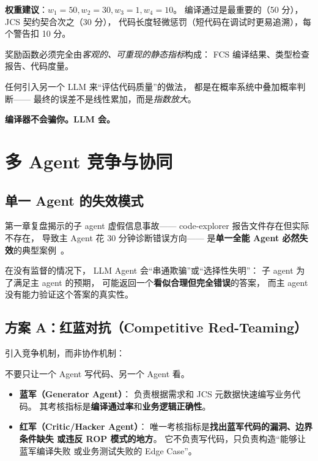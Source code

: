\documentclass[10pt, openany]{book}
\begin{document}
\textbf{权重建议}：\(w_1 = 50, w_2 = 30, w_3 = 1, w_4 = 10\)。
编译通过是最重要的（50 分），JCS 契约契合次之（30 分），
代码长度轻微惩罚（短代码在调试时更易追溯），每个警告扣 10 分。

\begin{principle}
    奖励函数必须完全由\emph{客观的、可重现的静态指标}构成：
    FCS 编译结果、类型检查报告、代码度量。
    
    任何引入另一个 LLM 来``评估代码质量''的做法，
    都是在概率系统中叠加概率判断——
    最终的误差不是线性累加，而是\emph{指数放大}。
    
    \textbf{编译器不会骗你。LLM 会。}
\end{principle}

\section{多 Agent 竞争与协同}

\subsection{单一 Agent 的失效模式}

第一章复盘揭示的子 agent 虚假信息事故——
code-explorer 报告文件存在但实际不存在，
导致主 Agent 花 30 分钟诊断错误方向——
是\textbf{单一全能 Agent 必然失效}的典型案例~\cite{Kadavath2022SelfEvaluation}。

在没有监督的情况下，
LLM Agent 会``串通欺骗''或``选择性失明''：
子 agent 为了满足主 agent 的预期，
可能返回一个\textbf{看似合理但完全错误}的答案，
而主 agent 没有能力验证这个答案的真实性。

\subsection{方案 A：红蓝对抗（Competitive Red-Teaming）}

引入竞争机制，而非协作机制：

\begin{definition}[红蓝对抗]
    不要只让一个 Agent 写代码、另一个 Agent 看。
    \begin{itemize}
        \item \textbf{蓝军（Generator Agent）}：
            负责根据需求和 JCS 元数据快速编写业务代码。
            其考核指标是\textbf{编译通过率}和\textbf{业务逻辑正确性}。
        \item \textbf{红军（Critic/Hacker Agent）}：
            唯一考核指标是\textbf{找出蓝军代码的漏洞、边界条件缺失
            或违反 ROP 模式的地方}。
            它不负责写代码，只负责构造``能够让蓝军编译失败
            或业务测试失败的 Edge Case''。
    \end{itemize}
\end{definition}
\end{document}
